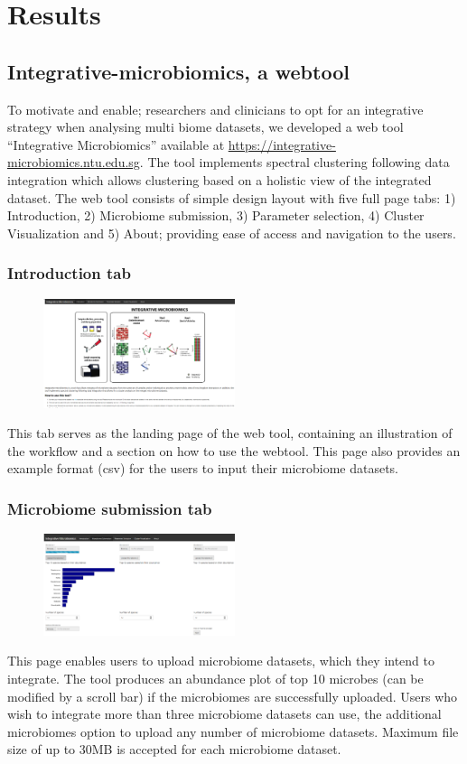 \section{Results}

\subsection{Integrative-microbiomics, a webtool}

To motivate and enable; researchers and clinicians to opt for an integrative strategy when analysing multi biome datasets, we developed a web tool “Integrative Microbiomics” available at  \url{https://integrative-microbiomics.ntu.edu.sg}. The tool implements spectral clustering following data integration which allows clustering based on a holistic view of the integrated dataset. The web tool consists of simple design layout with five full page tabs: 1) Introduction, 2) Microbiome submission, 3) Parameter selection, 4) Cluster Visualization and 5) About; providing ease of access and navigation to the users.
\subsubsection{Introduction tab}
\begin{figure}[H]
	\centering
	\includegraphics[width=0.5\textwidth]{image/Introduction_tab.PNG}
\end{figure}
This tab serves as the landing page of the web tool, containing an illustration of the workflow and a section on how to use the webtool. This page also provides an example format (csv) for the users to input their microbiome datasets.
\subsubsection{Microbiome submission tab}
\begin{figure}[!h]
	\centering
\includegraphics[width=0.5\textwidth]{image/microbiome_sub-tab.PNG}
\end{figure}
This page enables users to upload microbiome datasets, which they intend to integrate. The tool produces an abundance plot of top 10 microbes (can be modified by a scroll bar) if the microbiomes are successfully uploaded. Users who wish to integrate more than three microbiome datasets can use, the additional microbiomes option to upload any number of microbiome datasets. Maximum file size of up to 30MB is accepted for each microbiome dataset.
